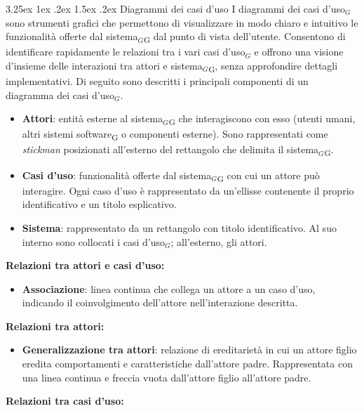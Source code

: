 \documentclass[a4paper, 10pt]{article}
\makeatletter
\renewcommand\paragraph{\@startsection{paragraph}{4}{\z@}%
  {3.25ex \@plus1ex \@minus .2ex}%
  {1.5ex \@plus .2ex}%
  {\normalfont\normalsize\bfseries}}
\makeatother
\begin{document}
\paragraph{Diagrammi dei casi d'uso}
I diagrammi dei casi d'uso$_G$ sono strumenti grafici che permettono di visualizzare in modo chiaro e intuitivo le funzionalità offerte dal sistema$_G$\textsubscript{G} dal punto di vista dell'utente. Consentono di identificare rapidamente le relazioni tra i vari casi d'uso$_G$ e offrono una visione d'insieme delle interazioni tra attori e sistema$_G$\textsubscript{G}, senza approfondire dettagli implementativi.
Di seguito sono descritti i principali componenti di un diagramma dei casi d'uso$_G$.
\begin{itemize}
    \item \textbf{Attori}: entità esterne al sistema$_G$\textsubscript{G} che interagiscono con esso (utenti umani, altri sistemi software\textsubscript{G} o componenti esterne). Sono rappresentati come \textit{stickman} posizionati all'esterno del rettangolo che delimita il sistema$_G$\textsubscript{G}.
    \item \textbf{Casi d'uso}: funzionalità offerte dal sistema$_G$\textsubscript{G} con cui un attore può interagire. Ogni caso d'uso è rappresentato da un'ellisse contenente il proprio identificativo e un titolo esplicativo.
    \item \textbf{Sistema}: rappresentato da un rettangolo con titolo identificativo. Al suo interno sono collocati i casi d'uso$_G$; all'esterno, gli attori.
\end{itemize}
\textbf{Relazioni tra attori e casi d'uso:}
\begin{itemize}
    \item \textbf{Associazione}: linea continua che collega un attore a un caso d'uso, indicando il coinvolgimento dell'attore nell'interazione descritta.
\end{itemize}
\textbf{Relazioni tra attori:}
\begin{itemize}
    \item \textbf{Generalizzazione tra attori}: relazione di ereditarietà in cui un attore figlio eredita comportamenti e caratteristiche dall'attore padre. Rappresentata con una linea continua e freccia vuota dall'attore figlio all'attore padre.
\end{itemize}
\textbf{Relazioni tra casi d'uso:}
\end{document}
